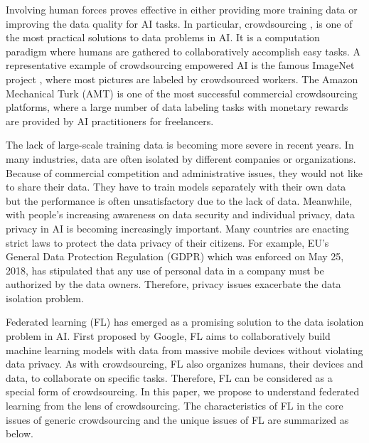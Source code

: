 \documentclass[11pt]{article}
\begin{document}
Involving human forces proves effective in either providing more training data or improving the data quality for AI tasks.
In particular, crowdsourcing \cite{DBLP:journals/tkde/ChittilappillyC16, DBLP:journals/vldb/TongZZCS20}, is one of the most practical solutions to data problems in AI. 
It is a computation paradigm where humans are gathered to collaboratively accomplish easy tasks. 
A representative example of crowdsourcing empowered AI is the famous ImageNet project \cite{DBLP:conf/cvpr/DengDSLL009}, where most pictures are labeled by crowdsourced workers. 
The Amazon Mechanical Turk (AMT) is one of the most successful commercial crowdsourcing platforms, where a large number of data labeling tasks with monetary rewards are provided by AI practitioners for freelancers. 

The lack of large-scale training data is becoming more severe in recent years. 
In many industries, data are often isolated by different companies or organizations. 
Because of commercial competition and administrative issues, they would not like to share their data. 
They have to train models separately with their own data but the performance is often unsatisfactory due to the lack of data. 
Meanwhile, with people's increasing awareness on data security and individual privacy, data privacy in AI is becoming increasingly important. 
Many countries are enacting strict laws to protect the data privacy of their citizens. 
For example, EU's General Data Protection Regulation (GDPR) which was enforced on May 25, 2018, has stipulated that any use of personal data in a company must be authorized by the data owners. 
Therefore, privacy issues exacerbate the data isolation problem.

Federated learning (FL) \cite{DBLP:journals/corr/KonecnyMYRSB16, DBLP:conf/aistats/McMahanMRHA17, DBLP:journals/tist/YangLCT19} has emerged as a promising solution to the data isolation problem in AI.
First proposed by Google, FL aims to collaboratively build machine learning models with data from massive mobile devices without violating data privacy. 
As with crowdsourcing, FL also organizes humans, their devices and data, to collaborate on specific tasks. Therefore, FL can be considered as a special form of crowdsourcing. 
In this paper, we propose to understand federated learning from the lens of crowdsourcing.
The characteristics of FL in the core issues of generic crowdsourcing and the unique issues of FL are summarized as below.
\end{document}
